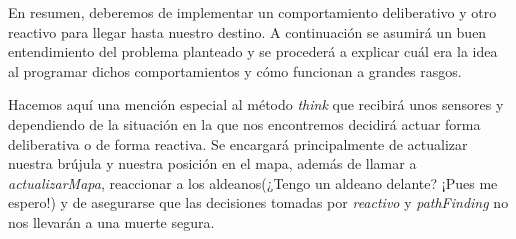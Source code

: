 \documentclass[12pt]{article}
\begin{document}
En resumen, deberemos de implementar un comportamiento deliberativo y otro reactivo para llegar hasta nuestro destino. A continuación se asumirá un buen entendimiento del problema planteado y se procederá a explicar cuál era la idea al programar dichos comportamientos y cómo funcionan a grandes rasgos.

Hacemos aquí una mención especial al método \emph{think} que recibirá unos sensores y dependiendo de la situación en la que nos encontremos decidirá actuar forma deliberativa o de forma reactiva. Se encargará principalmente de actualizar nuestra brújula y nuestra posición en el mapa, además de llamar a \emph{actualizarMapa}, reaccionar a los aldeanos(¿Tengo un aldeano delante? ¡Pues me espero!) y de asegurarse que las decisiones tomadas por \emph{reactivo} y \emph{pathFinding} no nos llevarán a una muerte segura.
\newpage
\end{document}
